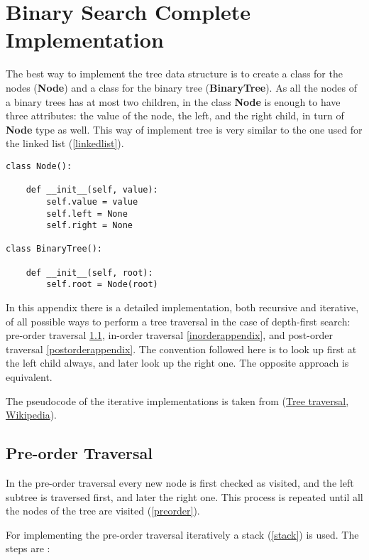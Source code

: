 \chapter{Binary Search Complete Implementation}
\label{binappendix}
The best way to implement the tree data structure is to create a class for the nodes (\textbf{Node}) and a class for the binary tree (\textbf{BinaryTree}). As all the nodes of a binary trees has at most two children, in the class \textbf{Node} is enough to have three attributes: the value of the node, the left, and the right child, in turn of \textbf{Node} type as well. This way of implement tree is very similar to the one used for the \hyperref[linked list]{} linked list (\ref{linkedlist}).

\begin{lstlisting}[firstnumber=1, caption={Class definition for a node and a tree.}]
class Node():

	def __init__(self, value):
		self.value = value
		self.left = None
		self.right = None

class BinaryTree():

	def __init__(self, root):
		self.root = Node(root)
\end{lstlisting}

In this appendix there is a detailed implementation, both recursive and iterative, of all possible ways to perform a tree traversal in the case of depth-first search: pre-order traversal \ref{preorderappendix}, in-order traversal \ref{inorderappendix}, and post-order traversal \ref{postorderappendix}. The convention followed here is to look up first at the left child always, and later look up the right one. The opposite approach is equivalent.

The pseudocode of the iterative implementations is taken from \cite{wikitreestrav}(\href{https://en.wikipedia.org/wiki/Tree_traversal}{Tree traversal, Wikipedia}).

\section{Pre-order Traversal}
\label{preorderappendix}
In the pre-order traversal every new node is first checked as visited, and the left subtree is traversed first, and later the right one. This process is repeated until all the nodes of the tree are visited (\ref{preorder}). 

For implementing the pre-order traversal iteratively a stack (\ref{stack}) is used. The steps are \cite{wikitreestrav}:

